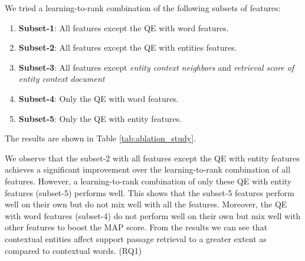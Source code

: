 \documentclass[sigconf]{acmart}
\begin{document}
We tried a learning-to-rank combination of the following subsets of features:
\begin{enumerate}
    \item \textbf{Subset-1}: All features except the QE with word features.
    \item \textbf{Subset-2}: All features except the QE with entities features.
     \item \textbf{Subset-3}: All features except \textit{entity context neighbors} and \textit{retrieval score of entity context document}
    \item \textbf{Subset-4}: Only the QE with word features.
    \item \textbf{Subset-5}: Only the QE with entity features.
\end{enumerate}
The results are shown in Table \ref{tab:ablation_study}.
\begin{table}
  \caption{Subset Ablation Study}
  \label{tab:ablation_study}
\end{table}
We observe that the subset-2 with all features except the QE with entity features achieves a significant improvement over the learning-to-rank combination of all features. However, a learning-to-rank combination of only these QE with entity features (subset-5) performs well. This shows that the subset-5 features perform well on their own but do not mix well with all the features. Moreover, the QE with word features (subset-4) do not perform well on their own but mix well with other features to boost the MAP score. From the results we can see that contextual entities affect support passage retrieval to a greater extent as compared to contextual words. (RQ1)
\end{document}
